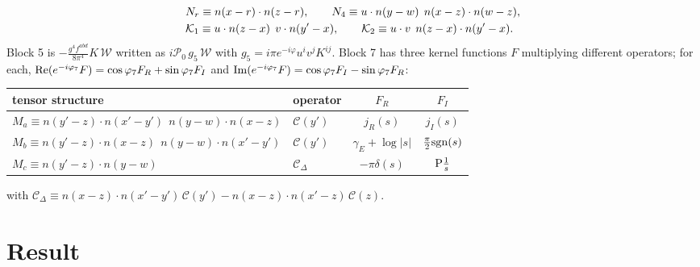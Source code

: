 \documentclass[10pt]{article}
\numberwithin{equation}{section}
\begin{document}
\begin{align}
&N_{r}\equiv n(x-r)\cdot n(z-r),\qquad N_{4}\equiv u\cdot n(y-w)\;\,n(x-z)\cdot n(w-z),\notag\\
&\mathcal{K}_{1}\equiv u\cdot n(z-x)\;\,v\cdot n(y'-x),\qquad\mathcal{K}_{2}\equiv u\cdot v\;\,n(z-x)\cdot n(y'-x).
\end{align}
Block 5 is $-\frac{g^{4}f^{abd}}{8\pi^{4}}K\,\mathcal{W}$ written as $i\mathcal{P}_{0}\,g_{5}\,\mathcal{W}$ with $g_{5}=i\pi e^{-i\varphi}u^{i}v^{j}K^{ij}$. Block 7 has three kernel functions $F$ multiplying different operators; for each, ${\rm Re}(e^{-i\varphi_{7}}F)=\cos\varphi_{7}F_{R}+\sin\varphi_{7}F_{I}$ and ${\rm Im}(e^{-i\varphi_{7}}F)=\cos\varphi_{7}F_{I}-\sin\varphi_{7}F_{R}$:
\begin{center}
\renewcommand{\arraystretch}{1.5}
\begin{tabular}{l|l|c|c}
tensor structure & operator & $F_{R}$ & $F_{I}$\\ \hline
$M_{a}\equiv n(y'-z)\cdot n(x'-y')\;\,n(y-w)\cdot n(x-z)$ & $\mathcal{C}(y')$ & $j_{R}(s)$ & $j_{I}(s)$\\
$M_{b}\equiv n(y'-z)\cdot n(x-z)\;\,n(y-w)\cdot n(x'-y')$ & $\mathcal{C}(y')$ & $\gamma_{E}+\log|s|$ & $\tfrac{\pi}{2}{\rm sgn}(s)$\\
$M_{c}\equiv n(y'-z)\cdot n(y-w)$ & $\mathcal{C}_{\Delta}$ & $-\pi\delta(s)$ & ${\rm P}\frac1s$
\end{tabular}
\end{center}
with $\mathcal{C}_{\Delta}\equiv n(x-z)\cdot n(x'-y')\,\mathcal{C}(y')-n(x-z)\cdot n(x'-z)\,\mathcal{C}(z)$.

\section{Result}
\end{document}
